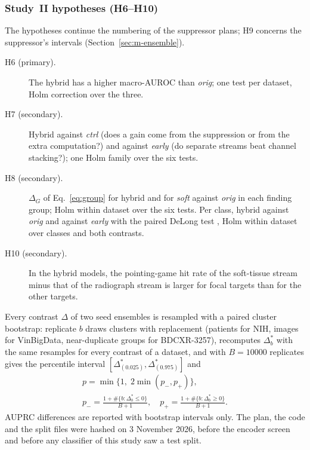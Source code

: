 \subsubsection{Study~II hypotheses (H6--H10)}
The hypotheses continue the numbering of the suppressor plans; H9 concerns the suppressor's intervals (Section~\ref{sec:m-ensemble}).
\begin{description}
\item[H6 (primary).] The hybrid has a higher macro-AUROC than \emph{orig}; one test per dataset, Holm correction over the three.
\item[H7 (secondary).] Hybrid against \emph{ctrl} (does a gain come from the suppression or from the extra computation?) and against
 \emph{early} (do separate streams beat channel stacking?); one Holm family over the six tests.
\item[H8 (secondary).] $\Delta_G$ of Eq.~\eqref{eq:group} for hybrid and for \emph{soft} against \emph{orig} in each finding group; Holm
 within dataset over the six tests. Per class, hybrid against \emph{orig} and against \emph{early} with the paired DeLong test
 \cite{delong1988auc}, Holm within dataset over classes and both contrasts.
\item[H10 (secondary).] In the hybrid models, the pointing-game hit rate of the soft-tissue stream minus that of the radiograph stream is
 larger for focal targets than for the other targets.
\end{description}
Every contrast $\Delta$ of two seed ensembles is resampled with a paired cluster bootstrap: replicate $b$ draws clusters with replacement
(patients for NIH, images for VinBigData, near-duplicate groups for BDCXR-3257), recomputes $\Delta^{*}_b$ with the same resamples for every
contrast of a dataset, and with $B=\num{10000}$ replicates gives the percentile interval $[\Delta^{*}_{(0.025)},\Delta^{*}_{(0.975)}]$ and
\begin{equation}
\begin{gathered}
p=\min\big\{1,\;2\min(p_{-},p_{+})\big\},\\
p_{-}=\frac{1+\#\{b:\Delta^{*}_b\le0\}}{B+1},\quad p_{+}=\frac{1+\#\{b:\Delta^{*}_b\ge0\}}{B+1}.
\end{gathered}
\label{eq:bootp}
\end{equation}
AUPRC differences are reported with bootstrap intervals only. The plan, the code and the split files were hashed on 3 November 2026, before
the encoder screen and before any classifier of this study saw a test split.

